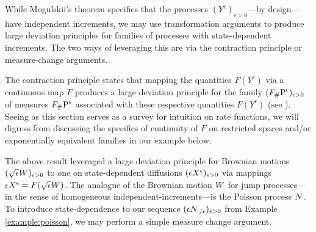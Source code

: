 While Mogulskii's theorem specifies that the processes $(Y^\epsilon)_{\epsilon>0}$---by design---have independent increments, we may use transformation arguments to produce large deviation principles for families of processes with state-dependent increments.
The two ways of leveraging this are via the contraction principle or measure-change arguments.

The contraction principle states that mapping the quantities $F(Y^\epsilon)$ via a continuous map $F$ produces a large deviation principle for the family $(\push{\Prb^\epsilon}{F})_{\epsilon>0}$ of measures $\push{\Prb^\epsilon}{F}$ associated with these respective quantities $F(Y^\epsilon)$ (see \cite[Theorem 4.2.1]{dembo2010}).
Seeing as this section serves as a survey for intuition on rate functions, we will digress from discussing the specifics of continuity of $F$ on restricted spaces and/or exponentially equivalent families in our example below.



The above result leveraged a large deviation principle for Brownian motions $(\sqrt\epsilon\W)_{\epsilon>0}$ to one on state-dependent diffusions $(\Xe)_{\epsilon>0}$ via mappings $\Xe = F(\sqrt\epsilon\W)$.
The analogue of the Brownian motion $\W$ for jump processes---in the sense of homogeneous independent-increments---is the Poisson process $\N$.
To introduce state-dependence to our sequence $(\epsilon\N_{\cdot/\epsilon})_{\epsilon>0}$ from Example \ref{example:poisson}, we may perform a simple measure change argument.


